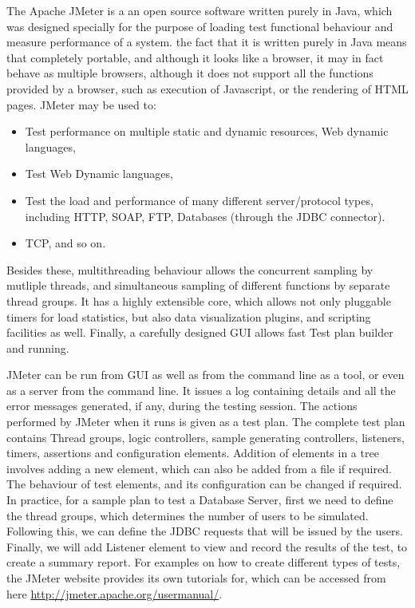 \documentclass[14pt]{article}
\begin{document}
The Apache JMeter \cite{apachejmeter} is a an open source software written purely in Java, which was designed specially for the purpose of loading test functional behaviour and measure performance of a system. the fact that it is written purely in Java means that completely portable, and although it looks like a browser, it may in fact behave as multiple browsers, although it does not support all the functions provided by a browser, such as execution of Javascript, or the rendering of HTML pages. JMeter may be used to:
\begin{itemize}
\item Test performance on multiple static and dynamic resources, Web dynamic languages, 
\item Test Web Dynamic languages,
\item Test the load and performance of many different server/protocol types, including HTTP, SOAP, FTP, Databases (through the JDBC connector).
\item TCP, and so on.
\end{itemize}

Besides these, multithreading behaviour allows the concurrent sampling by mutliple threads, and simultaneous sampling of different functions by separate thread groups. It has a highly extensible core, which allows not only pluggable timers for load statistics, but also data visualization plugins, and scripting facilities as well. Finally, a carefully designed GUI allows fast Test plan builder and running.

JMeter can be run from GUI as well as from the command line as a tool, or even as a server from the command line. It issues a log containing details and all the error messages generated, if any, during the testing session. The actions performed by JMeter when it runs is given as a test plan. The complete test plan contains Thread groups, logic controllers, sample generating controllers, listeners, timers, assertions and configuration elements. Addition of elements in a tree involves adding a new element, which can also be added from a file if required. The behaviour of test elements, and its configuration can be changed if required. In practice, for a sample plan to test a Database Server, first we need to define the thread groups, which determines the number of users to be simulated. Following this, we can define the JDBC requests that will be issued by the users. Finally, we will add Listener element to view and record the results of the test, to create a summary report. For examples on how to create different types of tests, the JMeter website provides its own tutorials for, which can be accessed from here \url{http://jmeter.apache.org/usermanual/}. 
\end{document}
